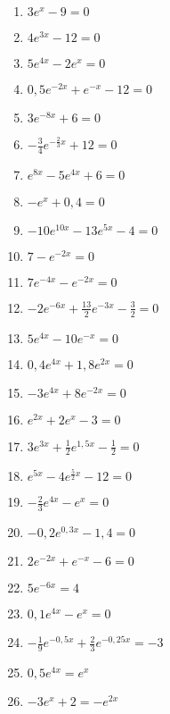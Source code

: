 \begin{Exercise}[title={Löse folgende Gleichungen}, label=eFktGlA1]

	\begin{minipage}{\textwidth}
		\begin{minipage}{0.5\textwidth}
			\begin{enumerate}[label=\alph*)]
				\item \(3e^x-9=0\)
				\item \(4e^{3x}-12=0\)
				\item \(5e^{4x}-2e^{x}=0\)
				\item \(0,5e^{-2x}+e^{-x}-12=0\)
				\item \(3e^{-8x}+6=0\)
				\item \(-\frac{3}{4}e^{-\tfrac{2}{3}x}+12=0\)
				\item \(e^{8x}-5e^{4x}+6=0\)
				\item \(-e^{x}+0,4=0\)
				\item \(-10e^{10x}-13e^{5x}-4=0\)
				\item \(7-e^{-2x}=0\)
				\item \(7e^{-4x}-e^{-2x}=0\)
				\item \(-2e^{-6x}+\frac{13}{2}e^{-3x}-\frac{3}{2}=0\)
				\item \(5e^{4x}-10e^{-x}=0\)
			\end{enumerate}
		\end{minipage}%
		\begin{minipage}{0.5\textwidth}
			\begin{enumerate}[label=\alph*)]
				\setcounter{enumi}{13}
				\item \(0,4e^{4x}+1,8e^{2x}=0\)
				\item \(-3e^{4x}+8e^{-2x}=0\)
				\item \(e^{2x}+2e^{x}-3=0\)
				\item \(3e^{3x}+\frac{1}{2}e^{1,5x}-\frac{1}{2}=0\)
				\item \(e^{5x}-4e^{\tfrac{5}{2}x}-12=0\)
				\item \(-\frac{2}{3}e^{4x}-e^{x}=0\)
				\item \(-0,2e^{0,3x}-1,4=0\)
				\item \(2e^{-2x}+e^{-x}-6=0\)
				\item \(5e^{-6x}=4\)
				\item \(0,1e^{4x}-e^{x}=0\)
				\item \(-\frac{1}{9}e^{-0,5x}+\frac{2}{3}e^{-0,25x}=-3\)
				\item \(0,5e^{4x}=e^{x}\)
				\item \(-3e^{x}+2=-e^{2x}\)
			\end{enumerate}
		\end{minipage}%
	\end{minipage}
\end{Exercise}
